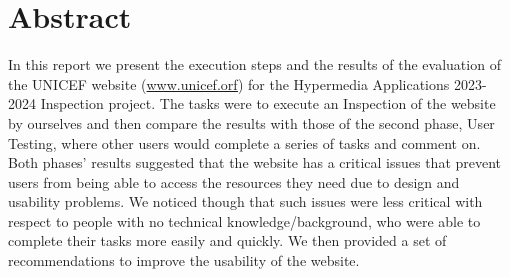 \section{Abstract}
In this report we present the execution steps and the results of the evaluation of the UNICEF website (\url{www.unicef.orf}) for the Hypermedia Applications 2023-2024 Inspection project. The tasks were to execute an Inspection of the website by ourselves and then compare the results with those of the second phase, User Testing, where other users would complete a series of tasks and comment on. Both phases' results suggested that the website has a critical issues that prevent users from being able to access the resources they need due to design and usability problems. We noticed though that such issues were less critical with respect to people with no technical knowledge/background, who were able to complete their tasks more easily and quickly. We then provided a set of recommendations to improve the usability of the website.
